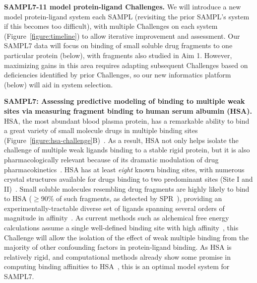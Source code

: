 \documentclass[11pt]{article}
\begin{document}
\textbf{SAMPL7-11 model protein-ligand Challenges.} 
We will introduce a new model protein-ligand system each SAMPL (revisiting the prior SAMPL's system if this becomes too difficult), with multiple Challenges on each system (Figure~\ref{figure:timeline}) to allow iterative improvement and assessment.
Our SAMPL7 data will focus on binding of small soluble drug fragments to one particular protein (below), with fragments also studied in Aim 1. 
However, maximizing gains in this area requires adapting subsequent Challenges based on deficiencies identified by prior Challenges, so our new informatics platform (below) will aid in system selection.

\textbf{SAMPL7: Assessing predictive modeling of binding to multiple weak sites via measuring fragment binding to human serum albumin (HSA).}
HSA, the most abundant blood plasma protein, has a remarkable ability to bind a great variety of small molecule drugs in multiple binding sites (Figure~\ref{figure:hsa-challenge}B)~\cite{Fasano:2005:IUBMBLife(InternationalUnionofBiochemistryandMolecularBiology:Life)}.
As a result, HSA not only helps isolate the challenge of multiple weak ligands binding to a stable rigid protein, but it is also pharmacologically relevant because of its dramatic modulation of drug pharmacokinetics~\cite{Hall:2013:JournalofChemicalInformationandModeling}.
HSA has at least \emph{eight} known binding sites, with numerous crystal structures available for drugs binding to two predominant sites (Site I and II)~\cite{Hall:2013:JournalofChemicalInformationandModeling}.
Small soluble molecules resembling drug fragments are highly likely to bind to HSA ($\ge$90\% of such fragments, as detected by SPR~\cite{Elinder:2011:JournalofBiomolecularScreening}), providing an experimentally-tractable diverse set of ligands spanning several orders of magnitude in affinity~\cite{Elinder:2011:JournalofBiomolecularScreening}.
As current methods such as alchemical free energy calculations assume a single well-defined binding site with high affinity~\cite{Gilson:1997:BiophysicalJournal}, this Challenge will allow the isolation of the effect of weak multiple binding from the majority of other confounding factors in protein-ligand binding.
As HSA is relatively rigid, and computational methods already show some promise in computing binding affinities to HSA~\cite{Hall:2013:JournalofChemicalInformationandModeling,Lexa:2014:PLoSONE,Evoli:2016:bioRxiv}, this is an optimal model system for SAMPL7.
\end{document}
